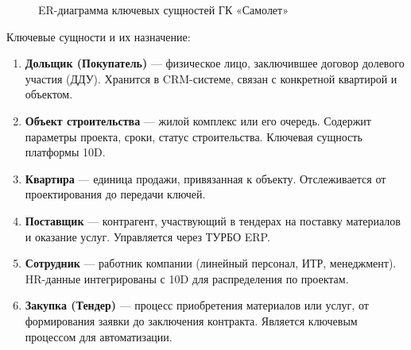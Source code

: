 \documentclass[12pt,a4paper]{article}
\begin{document}
\begin{figure}[H]
\caption{ER-диаграмма ключевых сущностей ГК «Самолет»}
\label{fig:er}
\end{figure}

Ключевые сущности и их назначение:

\begin{enumerate}[leftmargin=20pt]
  \item \textbf{Дольщик (Покупатель)} --- физическое лицо, заключившее договор долевого участия (ДДУ). Хранится в CRM-системе, связан с конкретной квартирой и объектом.
  \item \textbf{Объект строительства} --- жилой комплекс или его очередь. Содержит параметры проекта, сроки, статус строительства. Ключевая сущность платформы 10D.
  \item \textbf{Квартира} --- единица продажи, привязанная к объекту. Отслеживается от проектирования до передачи ключей.
  \item \textbf{Поставщик} --- контрагент, участвующий в тендерах на поставку материалов и оказание услуг. Управляется через ТУРБО ERP.
  \item \textbf{Сотрудник} --- работник компании (линейный персонал, ИТР, менеджмент). HR-данные интегрированы с 10D для распределения по проектам.
  \item \textbf{Закупка (Тендер)} --- процесс приобретения материалов или услуг, от формирования заявки до заключения контракта. Является ключевым процессом для автоматизации.
\end{enumerate}
\end{document}
